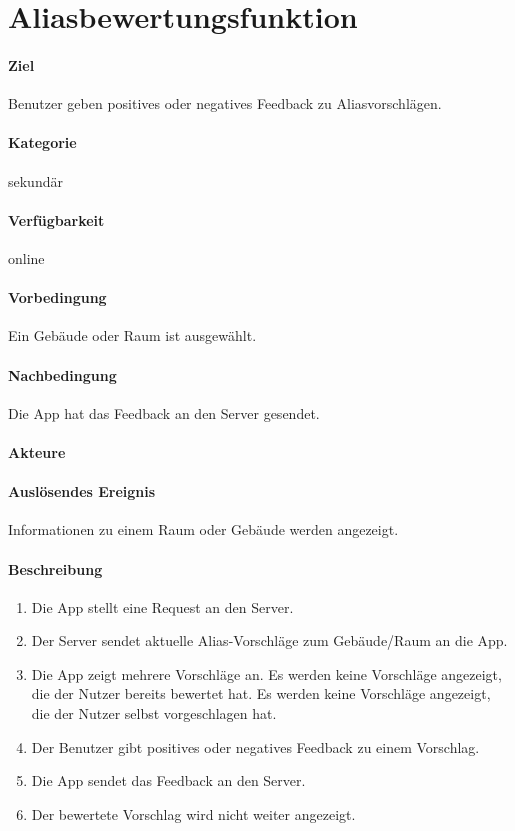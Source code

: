 \section{Aliasbewertungsfunktion}
\label{Aliasbewertungsfunktion}
\paragraph{Ziel}
Benutzer geben positives oder negatives Feedback zu Aliasvorschlägen.
\paragraph{Kategorie}
sekundär
\paragraph{Verfügbarkeit}
online
\paragraph{Vorbedingung}
Ein Gebäude oder Raum ist ausgewählt.
\paragraph{Nachbedingung}
Die App hat das Feedback an den Server gesendet.
\paragraph{Akteure}

\paragraph{Auslösendes Ereignis}
Informationen zu einem Raum oder Gebäude werden angezeigt.
\paragraph{Beschreibung}
\begin{enumerate}
    \item Die App stellt eine Request an den Server.
    \item Der Server sendet aktuelle Alias-Vorschläge zum Gebäude/Raum an die App.
    \item Die App zeigt mehrere Vorschläge an. Es werden keine Vorschläge angezeigt, die der Nutzer bereits bewertet hat. Es werden keine Vorschläge angezeigt, die der Nutzer selbst vorgeschlagen hat.
    \item Der Benutzer gibt positives oder negatives Feedback zu einem Vorschlag.
    \item Die App sendet das Feedback an den Server.
    \item Der bewertete Vorschlag wird nicht weiter angezeigt.
\end{enumerate}